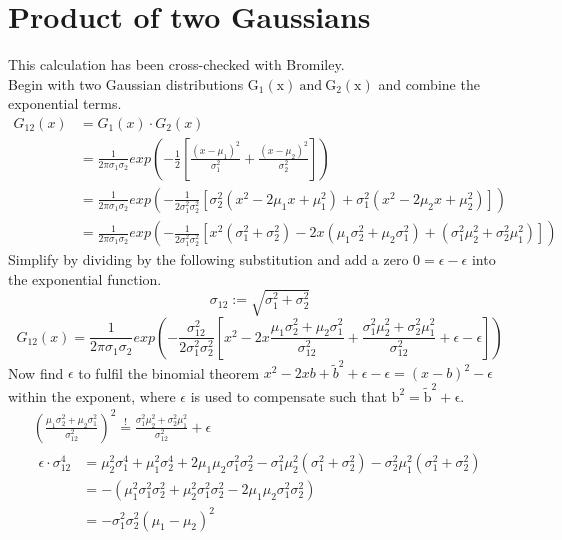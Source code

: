 \documentclass[twoside,openright,listof=numbered]{scrreprt}
\begin{document}
\section{Product of two Gaussians}\label{deriv:GaussiansDerivation}
This calculation has been cross-checked with Bromiley.\cite{Bromiley2014}\\
Begin with two Gaussian distributions $\mathrm{G_1(x)\ and \ G_2(x)}$ and combine the exponential terms.
\begin{equation*}
\begin{split}
G_{12}(x) & =  G_1(x) \cdot G_2(x) \\ 
& = \frac{1}{2\pi \sigma_1 \sigma_2}
exp\left(-\frac{1}{2}\left[\frac{\left(x-\mu_1\right)^2}{\sigma_1^2} + \frac{\left(x-\mu_2\right)^2}{\sigma_2^2} \right]\right)
\\
& = \frac{1}{2\pi \sigma_1 \sigma_2} exp \left(-\frac{1}{2\sigma_1^2 \sigma_2^2} \left[
\sigma_2^2 \left(x^2 - 2 \mu_1 x + \mu_1^2 \right) + 
\sigma_1^2 \left(x^2 - 2 \mu_2 x + \mu_2^2 \right)
\right] \right)
\\
& = \frac{1}{2\pi \sigma_1 \sigma_2} exp \left(-\frac{1}{2\sigma_1^2 \sigma_2^2} \left[
x^2(\sigma_1^2+\sigma_2^2) - 2x(\mu_1\sigma_2^2 + \mu_2\sigma_1^2) + (\sigma_1^2 \mu_2^2 + \sigma_2^2 \mu_1^2)
\right] \right)
\end{split}
\end{equation*}
Simplify by dividing by the following substitution and add a zero $0 = \epsilon - \epsilon$ into the exponential function.
\begin{equation*}
\sigma_{12} := \sqrt{\sigma_1^2+\sigma_2^2}
\end{equation*}
\begin{equation*}
G_{12}(x) = \frac{1}{2\pi \sigma_1 \sigma_2} exp \left(-\frac{\sigma_{12}^2}{2\sigma_1^2\sigma_2^2}\left[
x^2 - 2x\frac{\mu_1\sigma_2^2+ \mu_2\sigma_1^2}{\sigma_{12}^2} + \frac{\sigma_1^2\mu_2^2 + \sigma_2^2\mu_1^2}{\sigma_{12}^2}
+ \epsilon - \epsilon
\right]\right)
\end{equation*}
Now find $\epsilon$ to fulfil the binomial theorem $x^2- 2xb + \tilde{b}^2 + \epsilon - \epsilon= (x-b)^2 - \epsilon$ within the exponent, where $\epsilon$ is used to compensate such that $\mathrm{b^2 = \tilde{b}^2 + \epsilon}$.
\begin{gather*}
\left(\frac{\mu_1 \sigma_2^2 + \mu_2\sigma_1^2}{\sigma_{12}^2}\right)^2 \stackrel{!}{=} \frac{\sigma_1^2\mu_2^2 + \sigma_2^2\mu_1^2}{\sigma_{12}^2} + \epsilon
\\
\begin{split}
\epsilon \cdot \sigma_{12}^4  & = \mu_2^2\sigma_1^4 + \mu_1^2\sigma_2^4 + 2\mu_1\mu_2\sigma_1^2\sigma_2^2 - \sigma_1^2\mu_2^2(\sigma_1^2+ \sigma_2^2) - \sigma_2^2\mu_1^2(\sigma_1^2+ \sigma_2^2)\\
& = - (\mu_1^2\sigma_1^2\sigma_2^2 + \mu_2^2\sigma_1^2\sigma_2^2 - 2 \mu_1\mu_2\sigma_1^2\sigma_2^2)\\
& = - \sigma_1^2\sigma_2^2(\mu_1-\mu_2)^2
\end{split}
\end{gather*}
\end{document}
